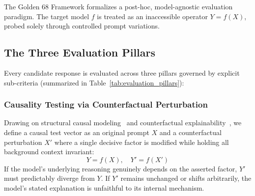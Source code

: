 \documentclass[conference]{IEEEtran}
\begin{document}
The Golden 68 Framework formalizes a post-hoc, model-agnostic evaluation paradigm. The target model $f$ is treated as an inaccessible operator $Y = f(X)$, probed solely through controlled prompt variations.

\subsection{The Three Evaluation Pillars}
Every candidate response is evaluated across three pillars governed by explicit sub-criteria (summarized in Table~\ref{tab:evaluation_pillars}):

\begin{table}[h]
\caption{\textbf{Evaluation Pillars and Sub-Criteria.}}
\label{tab:evaluation_pillars}
\centering
\renewcommand{\arraystretch}{1.2}
\end{table}

\subsubsection{Causality Testing via Counterfactual Perturbation}
Drawing on structural causal modeling~\cite{pearl2009causality} and counterfactual explainability~\cite{wachter2017counterfactual}, we define a causal test vector as an original prompt $X$ and a counterfactual perturbation $X'$ where a single decisive factor is modified while holding all background context invariant:
\begin{equation}
    Y = f(X), \quad Y' = f(X')
    \label{eq:counterfactual}
\end{equation}
If the model's underlying reasoning genuinely depends on the asserted factor, $Y'$ must predictably diverge from $Y$. If $Y'$ remains unchanged or shifts arbitrarily, the model's stated explanation is unfaithful to its internal mechanism.
\end{document}
